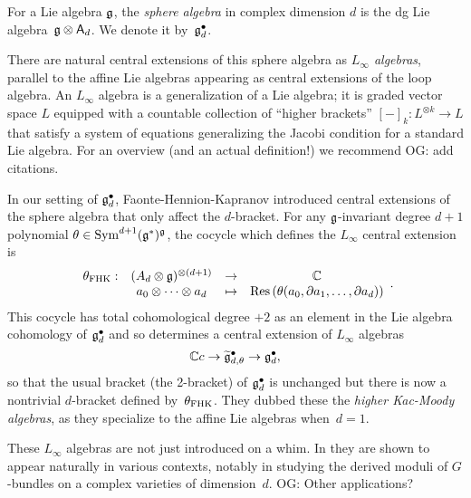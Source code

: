 \documentclass[11pt]{amsart}
\def\owen#1{{\textcolor{violet!65!black}{OG: {#1}}}}
\begin{document}
\begin{dfn}
For a Lie algebra $\mathfrak g$, the {\em sphere algebra} in complex dimension $d$ is the dg Lie algebra~$\mathfrak g \otimes \mathsf A_d$.
We denote it by~$\mathfrak g^\bullet_d$.
\end{dfn}

There are natural central extensions of this sphere algebra as {\em $L_\infty$ algebras},
parallel to the affine Lie algebras appearing as central extensions of the loop algebra.
An $L_\infty$ algebra is a generalization of a Lie algebra;
it is graded vector space $L$ equipped with a countable collection of ``higher brackets'' $[-]_k \colon L^{\otimes k} \to L$ that satisfy a system of equations generalizing the Jacobi condition for a standard Lie algebra.
For an overview (and an actual definition!) we recommend \owen{add citations}.

In our setting of $\mathfrak g^\bullet_d$, Faonte-Hennion-Kapranov introduced central extensions of the sphere algebra that only affect the $d$-bracket.
For any $\mathfrak g$-invariant degree $d+1$ polynomial $\theta \in \operatorname{Sym}^{d+1}(\mathfrak g^*)^\mathfrak g$, the cocycle which defines the $L_\infty$ central extension is
\[
\label{fhk cocycle}
\begin{array}{cccc}
\theta_{\rm FHK} : & (A_d \otimes \mathfrak g)^{\otimes (d+1)} & \to & \mathbb C\\ 
& a_0 \otimes \cdots \otimes a_d & \mapsto & {\rm Res} \left(\theta(a_0,\partial a_1,\ldots,\partial a_d)\right)
\end{array}.
\]
This cocycle has total cohomological degree $+2$ as an element in the Lie algebra cohomology of $\mathfrak g^\bullet_{d}$ and so determines a central extension of $L_\infty$ algebras
\[
\mathbb C c \to \widetilde{\mathfrak g}^\bullet_{d, \theta} \to \mathfrak g^\bullet_d ,
\]
so that the usual bracket (the 2-bracket) of $\mathfrak g^\bullet_d$ is unchanged but there is now a nontrivial $d$-bracket defined by~$\theta_{\rm FHK}$.
They dubbed these the {\em higher Kac-Moody algebras}, 
as they specialize to the affine Lie algebras when~$d =1$.

These $L_\infty$ algebras are not just introduced on a whim.
In \cite{FHK} they are shown to appear naturally in various contexts,
notably in studying the derived moduli of $G$-bundles on a complex varieties of dimension~$d$.
\owen{Other applications?}
\end{document}
